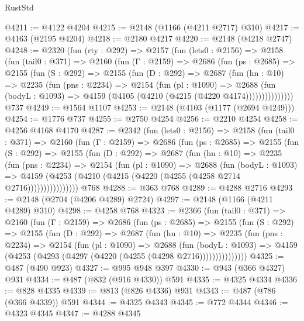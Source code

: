 \begin{lexlean}{RustStd}
\begin{coremodule}
@4211 := @4122 @4204
@4215 := @2148 (@1166 (@4211 @2717) @310)
@4217 := @4163 (@2195 @4204)
@4218 := @2180 @4217
@4220 := @2148 (@4218 @2747)
@4248 := @2320
    (fun (rty : @292) =>
    @2157
      (fun (lets0 : @2156) =>
      @2158
        (fun (tail0 : @371) =>
        @2160
          (fun (Γ : @2159) =>
          @2686
            (fun (ps : @2685) =>
            @2155
              (fun (S : @292) =>
              @2155
                (fun (D : @292) =>
                @2687
                  (fun (hn : @10) =>
                  @2235
                    (fun (pns : @2234) =>
                    @2154
                      (fun (pl : @1090) =>
                      @2688
                        (fun (bodyL : @1093) =>
                        @4159 (@4105 (@4210 (@4215 (@4220 @4174)))))))))))))))
    @737
@4249 := @1564 @1107
@4253 := @2148 (@4103 (@1177 (@2694 @4249)))
@4254 := @1776 @737
@4255 := @2750 @4254
@4256 := @2210 @4254
@4258 := @4256 @4168 @4170
@4287 := @2342
    (fun (lets0 : @2156) =>
    @2158
      (fun (tail0 : @371) =>
      @2160
        (fun (Γ : @2159) =>
        @2686
          (fun (ps : @2685) =>
          @2155
            (fun (S : @292) =>
            @2155
              (fun (D : @292) =>
              @2687
                (fun (hn : @10) =>
                @2235
                  (fun (pns : @2234) =>
                  @2154
                    (fun (pl : @1090) =>
                    @2688
                      (fun (bodyL : @1093) =>
                      @4159 (@4253 (@4210 (@4215 (@4220 (@4255 (@4258 @2714 @2716))))))))))))))))
    @768
@4288 := @363 @768
@4289 := @4288 @2716
@4293 := @2148 (@2704 (@4206 @4289) @2724)
@4297 := @2148 (@1166 (@4211 @4289) @310)
@4298 := @4258 @768
@4323 := @2366
    (fun (tail0 : @371) =>
    @2160
      (fun (Γ : @2159) =>
      @2686
        (fun (ps : @2685) =>
        @2155
          (fun (S : @292) =>
          @2155
            (fun (D : @292) =>
            @2687
              (fun (hn : @10) =>
              @2235
                (fun (pns : @2234) =>
                @2154
                  (fun (pl : @1090) =>
                  @2688
                    (fun (bodyL : @1093) =>
                    @4159 (@4253 (@4293 (@4297 (@4220 (@4255 (@4298 @2716)))))))))))))))
@4325 := @487 (@490 @923)
@4327 := @995 @948 @397
@4330 := @943 (@366 @4327) @931
@4334 := @487 (@832 (@916 @4330)) @591
@4335 := @4325 @4334
@4336 := @828 @4335
@4339 := @813 (@826 @4336) @931
@4343 := @487 (@786 (@366 @4339)) @591
@4344 := @4325 @4343
@4345 := @772 @4344
@4346 := @4323 @4345
@4347 := @4288 @4345

\end{coremodule}
\end{lexlean}
